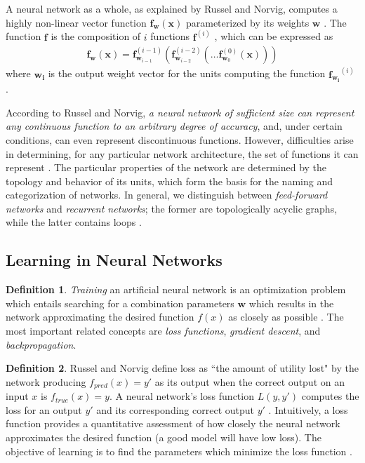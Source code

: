 \documentclass[12pt, titlepage]{report}
\theoremstyle{definition}
\newtheorem{definition}{Definition}
\begin{document}
A neural network as a whole, as explained by Russel and Norvig, computes a highly non-linear vector function $\bm{f}_{\bm{w}}(\bm{x})$ parameterized by its weights $\bm{w}$ \cite[p. 731, 732]{russel2009artificial}. The function $\bm{f}$ is the composition of $i$ functions $\bm{f}^{(i)}$ \cite[p. 164]{goodfellow2016deep}, which can be expressed as
 \begin{gather}\label{eq:neural_net_composition}
 \bm{f_w}(\bm{x}) = \bm{f}_{\bm{w}_{i-1}}^{(i-1)} (\bm{f}_{\bm{w}_{i-2}}^{(i-2)} ( \ldots \bm{f}_{\bm{w}_{0}}^{(0)}(\bm{x})))
\end{gather}
where $\bm{w_i}$ is the output weight vector for the units computing the function $\bm{f_{w_i}}^{(i)}$ \cite{goodfellow2016deep}.

According to Russel and Norvig, \emph{a neural network of sufficient size can represent any continuous function to an arbitrary degree of accuracy}, and, under certain conditions, can even represent discontinuous functions. However, difficulties arise in determining, for any particular network architecture, the set of functions it can represent \cite[p. 732]{russel2009artificial}. The particular properties of the network are determined by the topology and behavior of its units, which form the basis for the naming and categorization of networks. In general, we distinguish between \emph{feed-forward networks} and \emph{recurrent networks}; the former are topologically acyclic graphs, while the latter contains loops \cite[p. 729]{russel2009artificial}.


\subsection{Learning in Neural Networks}
\begin{definition}
\emph{Training} an artificial neural network is an optimization problem which entails searching for a combination parameters $\bm{w}$ which results in the network approximating the desired function $f(x)$ as closely as possible \cite[p. 718]{russel2009artificial}. The most important related concepts are \emph{loss functions}, \emph{gradient descent}, and \emph{backpropagation}.
\end{definition}

\begin{definition}
Russel and Norvig define loss as ``the amount of utility lost" by the network producing $f_{pred}(x) = y'$ as its output when the correct output on an input $x$ is $f_{true}(x) = y$. A neural network's loss function $L(y, y')$ computes the loss for an output $y'$ and its corresponding correct output $y'$ \cite{russel2009artificial}. Intuitively, a loss function provides a quantitative assessment of how closely the neural network approximates the desired function (a good model will have low loss). The objective of learning is to find the parameters which minimize the loss function \cite[Linear classification: Support Vector Machine, Softmax]{karpathy2017cs231n}.
\end{definition}
\end{document}
